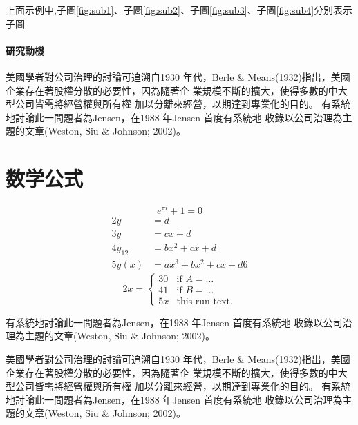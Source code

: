 \documentclass[
    添加扉页=是,
    添加原創聲明頁=是,
    添加校徽水印=是,
    奇偶页邊距對稱=不,
]{.def/must}
\begin{document}
上面示例中,子圖\ref{fig:sub1}、子圖\ref{fig:sub2}、子圖\ref{fig:sub3}、子圖\ref{fig:sub4}分別表示子圖








\subsubsection{研究動機}
美國學者對公司治理的討論可追溯自1930 年代，Berle \&
Means(1932)指出，美國企業存在著股權分散的必要性，因為隨著企
業規模不斷的擴大，使得多數的中大型公司皆需將經營權與所有權
加以分離來經營，以期達到專業化的目的。
有系統地討論此一問題者為Jensen，在1988 年Jensen 首度有系統地
收錄以公司治理為主題的文章(Weston, Siu \& Johnson; 2002)。







 
\chapter{数学公式}
\begin{equation}
\label{eq1}
e^{\pi i}+1=0
\end{equation}
\begin{align}
2 y & =d\label{eq:IntoSection}\\
3 y & =cx+d\\
4 y_{12} & =bx^{2}+cx+d\\
5 y(x) & =ax^{3}+bx^{2}+cx+d
6 
\end{align}
\begin{equation}
2 x=\left\{ \begin{array}{cl}
3 0 & \textrm{if }A=\ldots\\
4 1 & \textrm{if }B=\ldots\\
5 x & \textrm{this run  text.}\end
{array}\right.
\end{equation}        



有系統\cite{article}地討論此一問題者為Jensen，在1988 年Jensen 首度有系統地
收錄以公司治理為主題的文章(Weston, Siu \& Johnson; 2002)。

美國學者對公司治理的討論可追溯自1930 年代，Berle \&
Means(1932)指出，美國企業存在著股權分散的必要性，因為隨著企
業規模不斷的擴大，使得多數的中大型公司皆需將經營權與所有權
加以分離來經營，以期達到專業化的目的。
有系統地討論此一問題者為Jensen，在1988 年Jensen 首度有系統地
收錄以公司治理為主題的文章(Weston, Siu \& Johnson; 2002)。
\end{document}
